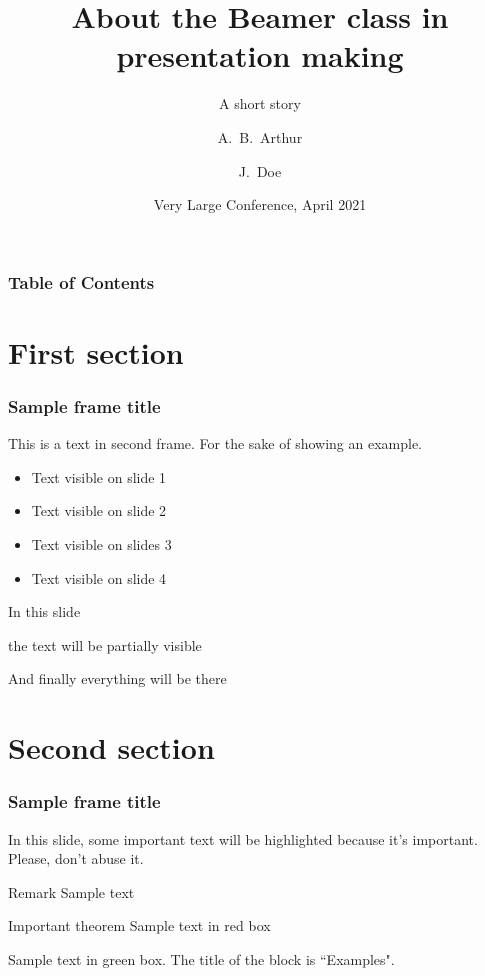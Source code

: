 \documentclass{beamer}
\title[About Beamer] %
{About the Beamer class in presentation making}
\subtitle{A short story}
\author[Arthur, Doe] %
{A.~B.~Arthur\inst{1} \and J.~Doe\inst{2}}
\institute[VFU] %
{
  \inst{1}%
  Faculty of Physics\\
  Very Famous University
  \and
  \inst{2}%
  Faculty of Chemistry\\
  Very Famous University
}
\date[VLC 2021] %
{Very Large Conference, April 2021}
\begin{document}
\frame{\titlepage}


\begin{frame}
\frametitle{Table of Contents}
\tableofcontents
\end{frame}


\section{First section}

\begin{frame}
\frametitle{Sample frame title}
This is a text in second frame. For the sake of showing an example.

\begin{itemize}
    \item<1-> Text visible on slide 1
    \item<2-> Text visible on slide 2
    \item<3> Text visible on slides 3
    \item<4-> Text visible on slide 4
\end{itemize}
\end{frame}



\begin{frame}
In this slide \pause

the text will be partially visible \pause

And finally everything will be there
\end{frame}

\section{Second section}

\begin{frame}
\frametitle{Sample frame title}

In this slide, some important text will be
\alert{highlighted} because it's important.
Please, don't abuse it.

\begin{block}{Remark}
Sample text
\end{block}

\begin{alertblock}{Important theorem}
Sample text in red box
\end{alertblock}

\begin{examples}
Sample text in green box. The title of the block is ``Examples".
\end{examples}
\end{frame}
\end{document}
